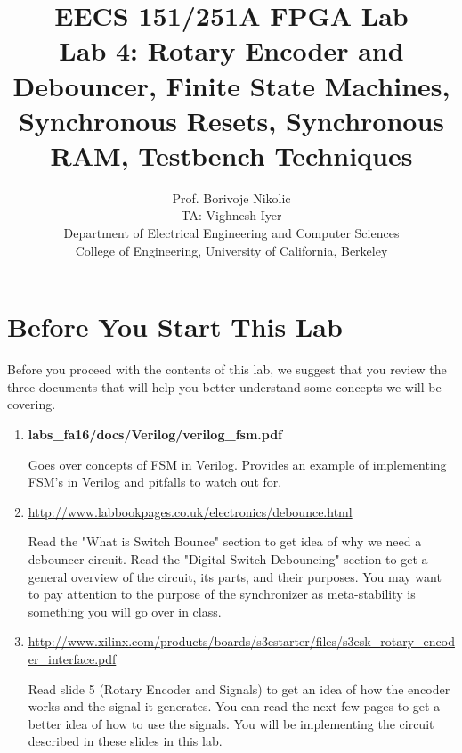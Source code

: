\documentclass[11pt]{article}
\begin{document}
\title{EECS 151/251A FPGA Lab\\
Lab 4: Rotary Encoder and Debouncer, Finite State Machines, Synchronous Resets, Synchronous RAM, Testbench Techniques}

\author{Prof. Borivoje Nikolic \\
TA: Vighnesh Iyer \\Department of Electrical Engineering and Computer Sciences\\
College of Engineering, University of California, Berkeley}
\date{}
\maketitle

\tableofcontents

\section{Before You Start This Lab}

Before you proceed with the contents of this lab, we suggest that you review the three documents that will help you better understand some concepts we will be covering.

\begin{enumerate}
	\item \textbf{labs\_fa16/docs/Verilog/verilog\_fsm.pdf}
	
	Goes over concepts of FSM in Verilog. Provides an example of  implementing FSM's in Verilog and pitfalls to watch out for.
	
	\item \url{http://www.labbookpages.co.uk/electronics/debounce.html}
	
	Read the "What is Switch Bounce" section to get idea of why we need a debouncer circuit. Read the "Digital Switch Debouncing" section to get a general overview of the circuit, its parts, and their purposes. You may want to pay attention to the purpose of the synchronizer as meta-stability is something you will go over in class.
	
	\item \url{http://www.xilinx.com/products/boards/s3estarter/files/s3esk_rotary_encoder_interface.pdf}
	
	Read slide 5 (Rotary Encoder and Signals) to get an idea of how the encoder works and the signal it generates. You can read the next few pages to get a better idea of how to use the signals. You will be implementing the circuit described in these slides in this lab.

\end{enumerate}
\end{document}
